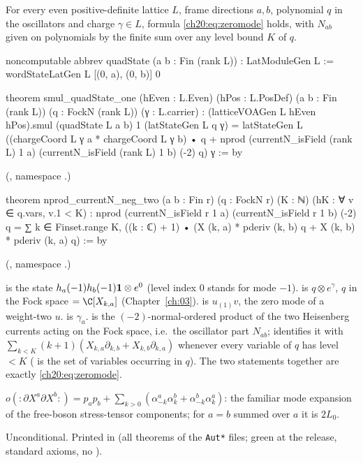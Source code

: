 \begin{lemma}\label{ch20:lem:zeromode}
For every even positive-definite lattice $L$, frame directions $a,b$, polynomial $q$ in the oscillators and charge
$\gamma\in L$, formula \eqref{ch20:eq:zeromode} holds, with $N_{ab}$ given on polynomials by the finite sum over any
level bound $K$ of $q$.
\end{lemma}
\begin{leancode}
noncomputable abbrev quadState (a b : Fin (rank L)) : LatModuleGen L :=
  wordStateLatGen L [(0, a), (0, b)] 0

theorem smul_quadState_one (hEven : L.Even) (hPos : L.PosDef) (a b : Fin (rank L))
    (q : FockN (rank L)) (γ : L.carrier) :
    (latticeVOAGen L hEven hPos).smul (quadState L a b) 1 (latStateGen L q γ)
      = latStateGen L
          ((chargeCoord L γ a * chargeCoord L γ b) • q
            + nprod (currentN_isField (rank L) 1 a) (currentN_isField (rank L) 1 b) (-2) q) γ := by
\end{leancode}
(, namespace .)
\begin{leancode}
theorem nprod_currentN_neg_two (a b : Fin r) (q : FockN r) (K : ℕ)
    (hK : ∀ v ∈ q.vars, v.1 < K) :
    nprod (currentN_isField r 1 a) (currentN_isField r 1 b) (-2) q
      = ∑ k ∈ Finset.range K, ((k : ℂ) + 1) •
          (X (k, a) * pderiv (k, b) q + X (k, b) * pderiv (k, a) q) := by
\end{leancode}
(, namespace .)
\begin{dictionary}
 is the state $h_a(-1)h_b(-1)\mathbf 1\otimes e^0$ (level index $0$
stands for mode $-1$).   is $q\otimes e^\gamma$, $q$ in the Fock space 
$=\C[X_{k,a}]$ (Chapter~\ref{ch:03}).   is $u_{(1)}v$, the zero mode of
a weight-two $u$.   is $\gamma_a$.   is the
$(-2)$-normal-ordered product of the two Heisenberg currents acting on the Fock space, i.e.\ the oscillator part
$N_{ab}$;  identifies it with
$\sum_{k<K}(k+1)(X_{k,a}\partial_{k,b}+X_{k,b}\partial_{k,a})$ whenever every variable of $q$ has level $<K$
( is the set of variables occurring in $q$).  The two statements together are exactly
\eqref{ch20:eq:zeromode}.
\end{dictionary}
\begin{physics}
$o({:}\partial X^a\partial X^b{:})=p_ap_b+\sum_{k>0}(\alpha^a_{-k}\alpha^b_k+\alpha^b_{-k}\alpha^a_k)$: the familiar
mode expansion of the free-boson stress-tensor components; for $a=b$ summed over $a$ it is $2L_0$.
\end{physics}
\begin{status}
Unconditional.  Printed in  (all theorems of the \texttt{Aut*} files; green at the release, standard axioms, no ).
\end{status}

